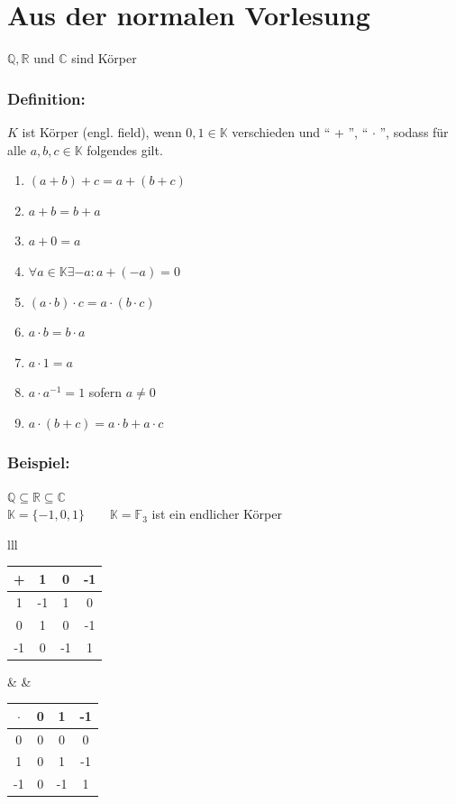 \section{Aus der normalen Vorlesung}
$\mathbb{Q},\mathbb{R}$ und $\mathbb{C}$ sind Körper\\
%
%
%
\subsubsection{Definition:}
$K$ ist Körper (engl. field), wenn $0,1 \in \mathbb{K}$ verschieden und "` + "', "` $\cdot$ "', sodass für alle $a,b,c \in \mathbb{K}$ folgendes gilt.
\begin{multicols}{2} 
\begin{enumerate}
	\item $(a+b)+c = a+(b+c)$
	\item $a+b = b+a$
	\item $a+0=a$
	\item $\forall a \in \mathbb{K} \exists -a: a+(-a)=0$
	\item $(a\cdot b)\cdot c = a\cdot (b \cdot c)$
	\item $a\cdot b = b \cdot a$
	\item $a\cdot 1 = a $
	\item $a \cdot a^{-1}=1$ sofern $a\neq 0$
	\item $a\cdot (b+c)=a\cdot b + a \cdot c$
\end{enumerate}
\end{multicols}
%
%
%
\subsubsection{Beispiel:}
$\mathbb{Q}\subseteq\mathbb{R}\subseteq\mathbb{C}$\\
$\mathbb{K}=\{-1,0,1\} \qquad \mathbb{K}=\mathbb{F}_{3}$ ist ein endlicher Körper\\
\begin{tabular}{lll}
	\begin{tabular}{c|ccc}
	+ & 1 & 0 & -1\\\hline
	1 & -1 & 1 & 0 \\
	0 & 1 & 0 & -1 \\
	-1 & 0 & -1 & 1 \\
	\end{tabular}
& &
	\begin{tabular}{c|ccc}
	$\cdot$ & 0 & 1 & -1 \\\hline
	0 & 0 & 0 & 0 \\
	1 & 0 & 1 & -1 \\
	-1 & 0 & -1 & 1\\
	\end{tabular}
\end{tabular}
%
%
%
